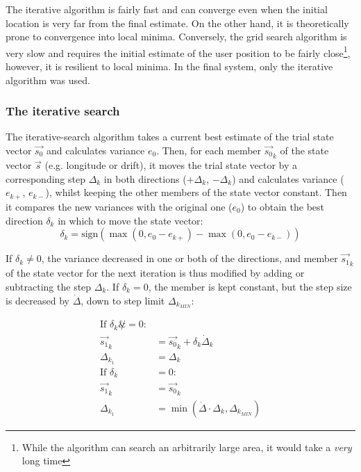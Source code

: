 The iterative algorithm is fairly fast and can converge even when the initial location is very far from the final estimate. On the other hand, it is theoretically prone to convergence into local minima. Conversely, the grid search algorithm is very slow and requires the initial estimate of the user position to be fairly close\footnote{While the algorithm can search an arbitrarily large area, it would take a \textit{very} long time}, however, it is resilient to local minima. In the final system, only the iterative algorithm was used.

\subsubsection{The iterative search}
The iterative-search algorithm takes a current best estimate of the trial state vector $\Vec{s_0}$ and calculates variance $e_0$. Then, for each member $\Vec{s_0}_k$ of the state vector $\Vec{s}$ (e.g. longitude or drift), it moves the trial state vector by a corresponding step $\Delta_k$ in both directions ($+\Delta_k$, $-\Delta_k$) and calculates variance ($e_{k+}$, $e_{k-}$), whilst keeping the other members of the state vector constant. Then it compares the new variances with the original one ($e_0$) to obtain the best direction $\delta_k$ in which to move the state vector:
\begin{equation*}
    \delta_k = \text{sign}(\max(0, e_0 - e_{k+}) - \max(0, e_0 - e_{k-}))
\end{equation*}

If $\delta_k \not = 0$, the variance decreased in one or both of the directions, and member $\Vec{s_1}_k$ of the state vector for the next iteration is thus modified by adding or subtracting the step $\Delta_k$. If $\delta_k = 0$, the member is kept constant, but the step size is decreased by $\dot\Delta$, down to step limit $\Delta_{k_{MIN}}$:

\begin{align*}
    \text{If } \delta_k \not &= 0: \\
        \Vec{s_1}_k &= \Vec{s_0}_k + \delta_k \dot \Delta_k \\
        \Delta_{k_1} &= \Delta_{k} \\
    \text{If } \delta_k &= 0: \\
        \Vec{s_1}_k &= \Vec{s_0}_k \\
        \Delta_{k_1} &= \min(\dot\Delta \cdot \Delta_k, \Delta_{k_{MIN}})
\end{align*}


